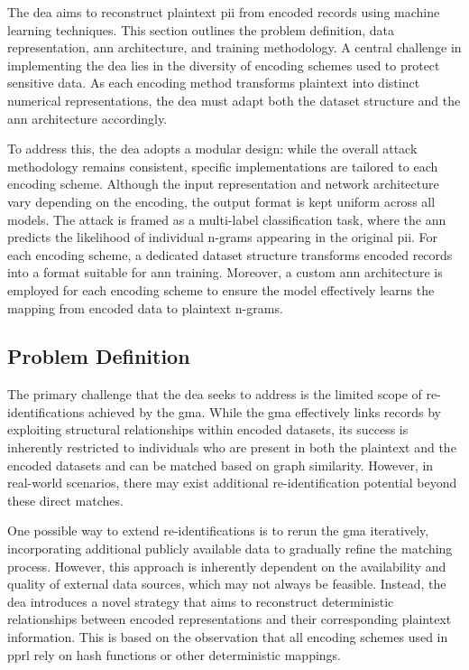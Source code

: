 The \ac{dea} aims to reconstruct plaintext \ac{pii} from encoded records using machine learning techniques.
This section outlines the problem definition, data representation, \ac{ann} architecture, and training methodology.
A central challenge in implementing the \ac{dea} lies in the diversity of encoding schemes used to protect sensitive data.
As each encoding method transforms plaintext into distinct numerical representations, the \ac{dea} must adapt both the dataset structure and the \ac{ann} architecture accordingly.

To address this, the \ac{dea} adopts a modular design: while the overall attack methodology remains consistent, specific implementations are tailored to each encoding scheme.
Although the input representation and network architecture vary depending on the encoding, the output format is kept uniform across all models.
The attack is framed as a multi-label classification task, where the \ac{ann} predicts the likelihood of individual n-grams appearing in the original \ac{pii}.
For each encoding scheme, a dedicated dataset structure transforms encoded records into a format suitable for \ac{ann} training.
Moreover, a custom \ac{ann} architecture is employed for each encoding scheme to ensure the model effectively learns the mapping from encoded data to plaintext n-grams.


\subsection{Problem Definition} \label{sec:problemdefinition}

The primary challenge that the \ac{dea} seeks to address is the limited scope of re-identifications achieved by the \ac{gma}.
While the \ac{gma} effectively links records by exploiting structural relationships within encoded datasets, its success is inherently restricted to individuals who are present in both the plaintext and the encoded datasets and can be matched based on graph similarity.
However, in real-world scenarios, there may exist additional re-identification potential beyond these direct matches.

One possible way to extend re-identifications is to rerun the \ac{gma} iteratively, incorporating additional publicly available data to gradually refine the matching process.
However, this approach is inherently dependent on the availability and quality of external data sources, which may not always be feasible.
Instead, the \ac{dea} introduces a novel strategy that aims to reconstruct deterministic relationships between encoded representations and their corresponding plaintext information.
This is based on the observation that all encoding schemes used in \ac{pprl} rely on hash functions or other deterministic mappings.

